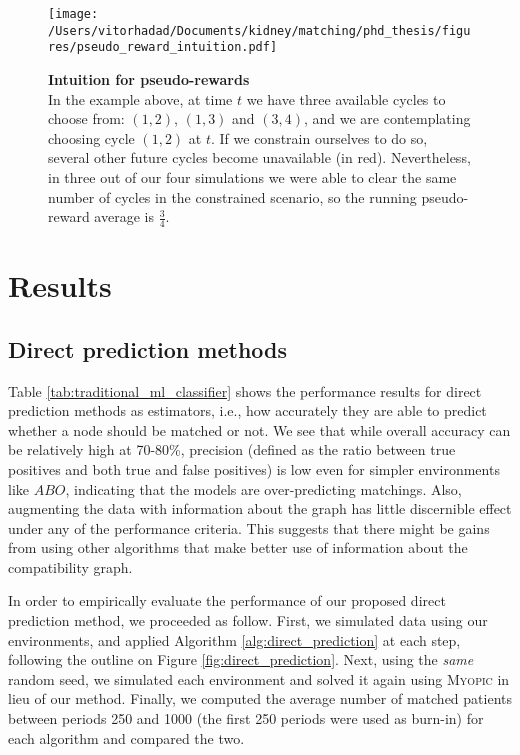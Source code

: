 \begin{landscape}
\begin{figure}[h]
\centering
\texttt{[image: /Users/vitorhadad/Documents/kidney/matching/phd\_thesis/figures/pseudo\_reward\_intuition.pdf]}
\caption[Intuition for pseudo-rewards]{\textbf{Intuition for pseudo-rewards} \\
  In the example above, at time $t$ we have three available cycles to choose from: $(1,2)$, $(1,3)$ and $(3,4)$, and we are contemplating choosing cycle $(1,2)$ at $t$. If we  constrain ourselves to do so, several other future cycles become unavailable (in red). Nevertheless, in three out of our four simulations we were able to clear the same number of cycles in the constrained scenario, so the running pseudo-reward average is $\frac{3}{4}$. 
}
\label{fig:pseudo_reward_intuition}
\end{figure}
\end{landscape}



\section{Results}

\subsection{Direct prediction methods} 

Table \ref{tab:traditional_ml_classifier} shows the performance results for direct prediction methods as estimators, i.e., how accurately they are able to predict whether a node should be matched or not. We see that while overall accuracy can be relatively high at 70-80\%, precision (defined as the ratio between true positives and both true and false positives) is low even for simpler environments like $ABO$, indicating that the models are over-predicting matchings. Also, augmenting the data with information about the graph has little discernible effect under any of the performance criteria. This suggests that there might be gains from using other algorithms that make better use of information about the compatibility graph. 

In order to empirically evaluate the performance of our proposed direct prediction method, we proceeded as follow. First, we simulated data using our environments, and applied Algorithm \ref{alg:direct_prediction} at each step, following the outline on Figure \ref{fig:direct_prediction}. Next, using the \emph{same} random seed, we simulated each environment and solved it again using \textsc{Myopic} in lieu of our method. Finally, we computed the average number of matched patients between periods 250 and 1000 (the first 250 periods were used as burn-in) for each algorithm and compared the two. 

